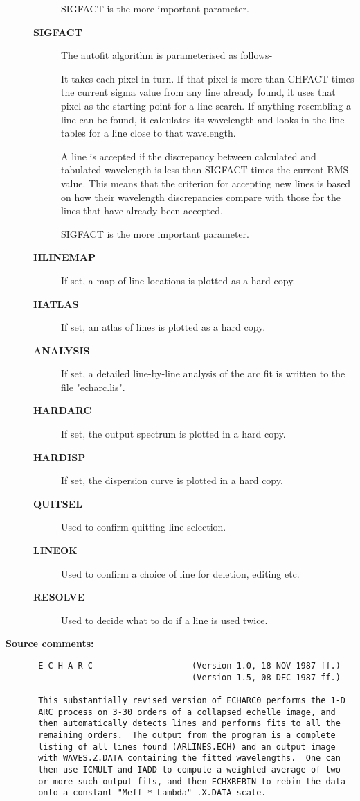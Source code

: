 \begin{description}
\begin{description}
 SIGFACT is the more important parameter.
\item [{\bf SIGFACT}]
 The autofit algorithm is parameterised as follows-

   It takes each pixel in turn.  If that pixel is more than CHFACT
   times the current sigma value from any line already found, it uses
   that pixel as the starting point for a line search.  If anything
   resembling a line can be found, it calculates its wavelength and
   looks in the line tables for a line close to that wavelength.

   A line is accepted if the discrepancy between calculated and
   tabulated wavelength is less than SIGFACT times the current RMS
   value.  This means that the criterion for accepting new lines
   is based on how their wavelength discrepancies compare with those for
   the lines that have already been accepted.

 SIGFACT is the more important parameter.
\item [{\bf HLINEMAP}]
 If set, a map of line locations is plotted as a hard copy.
\item [{\bf HATLAS}]
 If set, an atlas of lines is plotted as a hard copy.
\item [{\bf ANALYSIS}]
 If set, a detailed line-by-line analysis of the arc fit is
 written to the file "echarc.lis".
\item [{\bf HARDARC}]
 If set, the output spectrum is plotted in a hard copy.
\item [{\bf HARDISP}]
 If set, the dispersion curve is plotted in a hard copy.
\item [{\bf QUITSEL}]
 Used to confirm quitting line selection.
\item [{\bf LINEOK}]
 Used to confirm a choice of line for deletion, editing etc.
\item [{\bf RESOLVE}]
 Used to decide what to do if a line is used twice.
\end{description}

\item [{\bf Source comments:}]
\begin{verbatim}
 E C H A R C                    (Version 1.0, 18-NOV-1987 ff.)
                                (Version 1.5, 08-DEC-1987 ff.)

 This substantially revised version of ECHARC0 performs the 1-D
 ARC process on 3-30 orders of a collapsed echelle image, and
 then automatically detects lines and performs fits to all the
 remaining orders.  The output from the program is a complete
 listing of all lines found (ARLINES.ECH) and an output image
 with WAVES.Z.DATA containing the fitted wavelengths.  One can
 then use ICMULT and IADD to compute a weighted average of two
 or more such output fits, and then ECHXREBIN to rebin the data
 onto a constant "Meff * Lambda" .X.DATA scale.


\end{verbatim}
\end{description}
